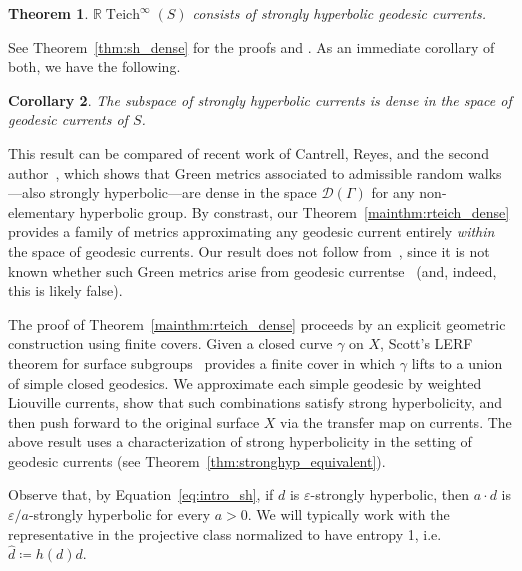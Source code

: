 \documentclass[12pt]{amsart}
\numberwithin{equation}{section}
\numberwithin{figure}{section}
\newtheorem{mainthm}{Theorem}
\newtheorem{maincor}[mainthm]{Corollary}
\theoremstyle{definition}
\theoremstyle{plain}
\DeclareMathOperator{\Teich}{Teich}
\renewcommand{\epsilon}{\varepsilon}
\begin{document}
\begin{mainthm}
$\mathbb{R}\Teich^\infty(S)$ consists of strongly hyperbolic geodesic currents.
\label{mainthm:rinftyeich_sh}
\end{mainthm}

See Theorem~\ref{thm:sh_dense} for the proofs  and . As an immediate corollary of both, we have the following.

\begin{maincor}
The subspace of strongly hyperbolic currents is dense in the space of geodesic currents of $S$.
\label{maincor:density}
\end{maincor}



This result can be compared of recent work of Cantrell, Reyes, and the second author~\cite[Theorem~C]{CMGR26:GreenMetrics}, which shows that Green metrics associated to admissible random walks---also strongly hyperbolic---are dense in the space $\mathcal{D}(\Gamma)$ for any non-elementary hyperbolic group. 
By constrast, our Theorem~\ref{mainthm:rteich_dense} provides a family of metrics approximating any geodesic current entirely \emph{within} the space of geodesic currents. Our result does not follow from~\cite[Theorem~C]{CMGR26:GreenMetrics}, since it is not known whether such Green metrics arise from geodesic currentse~\cite[Question~11.8]{MGT25:Intersections} (and, indeed, this is likely false). 

The proof of Theorem~\ref{mainthm:rteich_dense} proceeds by an explicit geometric construction using finite covers. 
Given a closed curve $\gamma$ on $X$, Scott's LERF theorem for surface subgroups~\cite{Scott78:LERF} provides a finite cover in which $\gamma$ lifts to a union of simple closed geodesics. 
We approximate each simple geodesic by weighted Liouville currents, show that such combinations satisfy strong hyperbolicity, and then push forward to the original surface $X$ via the transfer map on currents. The above result uses a characterization of strong hyperbolicity in the setting of geodesic currents (see Theorem~\ref{thm:stronghyp_equivalent}). 

Observe that, by Equation~\ref{eq:intro_sh}, if $d$ is $\epsilon$-strongly hyperbolic, then $a \cdot d$ is $\epsilon/a$-strongly hyperbolic for every $a>0$. We will typically work with the representative in the projective class normalized to have entropy 1, i.e. $\hat{d} \coloneqq h(d) d$.
\end{document}
